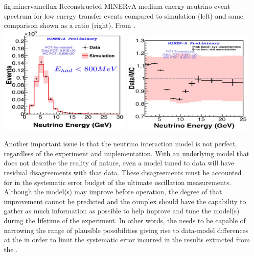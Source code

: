 \begin{dunefigure}{fig:minervameflux}
{Reconstructed MINERvA medium energy  neutrino event spectrum for low energy transfer events compared to simulation (left) and same comparison shown as a ratio (right). From \cite{JenaNUINT2018}.}
\includegraphics[width=0.49\textwidth]{graphics/minerva_enu.jpg}
\includegraphics[width=0.49\textwidth]{graphics/minerva_enuratio.jpg}
\end{dunefigure}

Another important issue is that the neutrino interaction model is not perfect, regardless of the experiment and implementation.  With an underlying model that does not describe the reality of nature, even a model tuned to   data will have residual disagreements with that data.  These disagreements must be accounted for in the systematic error budget of the ultimate oscillation measurements.  Although the model(s) may improve before  operation, the degree of that improvement cannot be predicted and the    complex should have the capability to gather as much information as possible to help improve and tune the model(s) during the lifetime of the experiment.  In other words, the   needs to be capable of narrowing the range of plausible possibilities giving rise to data-model differences at the   in order to limit the systematic error incurred in the results extracted from the  .   

